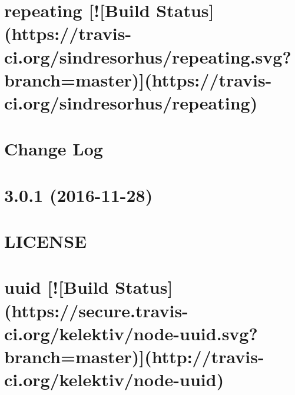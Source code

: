 \documentclass[twoside]{book}
\newcommand{\+}{\discretionary{\mbox{\scriptsize$\hookleftarrow$}}{}{}}
\begin{document}
\chapter{repeating \mbox{[}!\mbox{[}Build Status\mbox{]}(https\+://travis-\/ci.org/sindresorhus/repeating.svg?branch=master)\mbox{]}(https\+://travis-\/ci.org/sindresorhus/repeating)}
\label{md__c_1_workspace_demo_src_main_script_node_modules_repeating_readme}

\chapter{Change Log}
\label{md__c_1_workspace_demo_src_main_script_node_modules_request__c_h_a_n_g_e_l_o_g}

\chapter{3.0.1 (2016-\/11-\/28)}
\label{md__c_1_workspace_demo_src_main_script_node_modules_request_node_modules_uuid__h_i_s_t_o_r_y}

\chapter{L\+I\+C\+E\+N\+SE}
\label{md__c_1_workspace_demo_src_main_script_node_modules_request_node_modules_uuid__l_i_c_e_n_s_e}

\chapter{uuid \mbox{[}!\mbox{[}Build Status\mbox{]}(https\+://secure.travis-\/ci.org/kelektiv/node-\/uuid.svg?branch=master)\mbox{]}(http\+://travis-\/ci.org/kelektiv/node-\/uuid)}
\label{md__c_1_workspace_demo_src_main_script_node_modules_request_node_modules_uuid__r_e_a_d_m_e}

\end{document}
